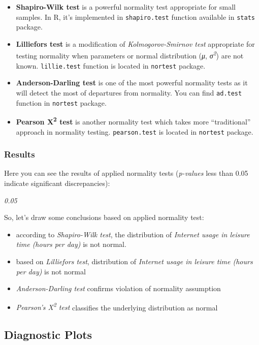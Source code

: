 \documentclass[]{article}
\begin{document}
\begin{itemize}
\item
  \textbf{Shapiro-Wilk test} is a powerful normality test appropriate
  for small samples. In R, it's implemented in \texttt{shapiro.test}
  function available in \texttt{stats} package.
\item
  \textbf{Lilliefors test} is a modification of \emph{Kolmogorov-Smirnov
  test} appropriate for testing normality when parameters or normal
  distribution (\emph{μ}, \emph{σ\textsuperscript{2}}) are not known.
  \texttt{lillie.test} function is located in \texttt{nortest} package.
\item
  \textbf{Anderson-Darling test} is one of the most powerful normality
  tests as it will detect the most of departures from normality. You can
  find \texttt{ad.test} function in \texttt{nortest} package.
\item
  \textbf{Pearson Χ\textsuperscript{2} test} is another normality test
  which takes more ``traditional'' approach in normality testing.
  \texttt{pearson.test} is located in \texttt{nortest} package.
\end{itemize}
\subsubsection{Results}

Here you can see the results of applied normality tests (\emph{p-values}
less than 0.05 indicate significant discrepancies):

\emph{0.05}

So, let's draw some conclusions based on applied normality test:

\begin{itemize}
\item
  according to \emph{Shapiro-Wilk test}, the distribution of
  \emph{Internet usage in leisure time (hours per day)} is not normal.
\item
  based on \emph{Lilliefors test}, distribution of \emph{Internet usage
  in leisure time (hours per day)} is not normal
\item
  \emph{Anderson-Darling test} confirms violation of normality
  assumption
\item
  \emph{Pearson's Χ\textsuperscript{2} test} classifies the underlying
  distribution as normal
\end{itemize}
\subsection{Diagnostic Plots}
\end{document}
